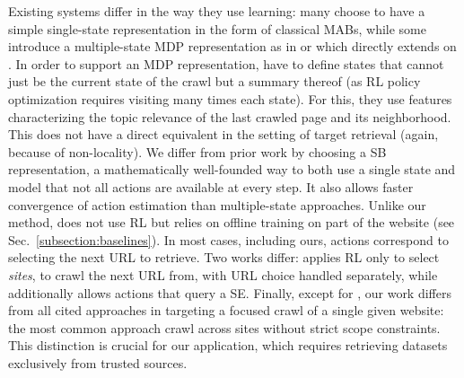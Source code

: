 \begin{asparaenum}
  Existing systems differ in the way they use learning: many choose to have
  a simple single-state representation
  \cite{gouriten2014scalable,meusel2014focused,zhang2021dsdd} in the form
  of classical MABs, while some introduce a multiple-state MDP
  representation as in \cite{han2018focused} or
  \cite{kontogiannis2022tree} which directly extends on
  \cite{han2018focused}. In order to support an MDP representation,
  \cite{han2018focused,kontogiannis2022tree} have to define states that
  cannot just be the current state of the crawl but a summary thereof (as
  RL policy optimization requires visiting many times each state). For
  this, they use features characterizing the topic relevance of the last crawled
  page and its neighborhood. This does not have a direct
  equivalent in the setting of target retrieval (again, because of
  non-locality). 
  We differ from prior work by choosing a SB representation, a mathematically well-founded way to both use a single state and model that not all actions are available at every step. It also allows faster convergence of action estimation than multiple-state approaches. Unlike our method, \cite{faheem2015adaptive} does not use RL but relies on offline training on part of the website (see Sec.~\ref{subsection:baselines}).
  In most cases, including ours, actions correspond to selecting the next URL to retrieve. Two works differ: \cite{meusel2014focused} applies RL only to select \emph{sites}, to crawl the next URL from, with URL choice handled separately, while \cite{zhang2021dsdd} additionally allows actions that query a SE.
  Finally, except for \cite{faheem2015adaptive}, our work differs from all cited approaches in targeting a focused crawl of a single given website: the most common approach crawl across sites without strict scope constraints. This distinction is crucial for our application, which requires retrieving datasets exclusively from trusted sources.


\end{asparaenum}
